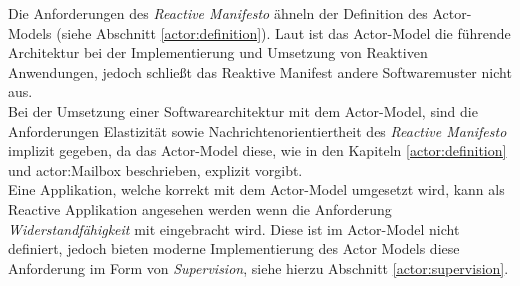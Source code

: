 Die Anforderungen des \textit{Reactive Manifesto} ähneln der Definition des Actor-Models (siehe Abschnitt \ref{actor:definition}). Laut \cite{Vernon2015ReactiveAkka} ist das Actor-Model die führende Architektur bei der Implementierung und Umsetzung von Reaktiven Anwendungen, jedoch schließt das Reaktive Manifest andere Softwaremuster nicht aus. \\
Bei der Umsetzung einer Softwarearchitektur mit dem Actor-Model, sind die Anforderungen  Elastizität sowie  Nachrichtenorientiertheit des \textit{Reactive Manifesto} implizit gegeben, da das Actor-Model diese, wie in den Kapiteln \ref{actor:definition} und    {actor:Mailbox} beschrieben, explizit vorgibt.\\Eine Applikation, welche korrekt mit dem Actor-Model umgesetzt wird, kann als Reactive Applikation angesehen werden wenn die Anforderung \textit{Widerstandfähigkeit} mit eingebracht wird. Diese ist im Actor-Model nicht definiert, jedoch bieten moderne Implementierung des Actor Models diese Anforderung im Form von \textit{Supervision}, siehe hierzu Abschnitt \ref{actor:supervision}.
